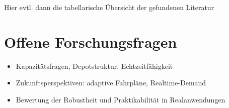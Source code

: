 Hier evtl. dann die tabellarische Übersicht der gefundenen Literatur
\section{Offene Forschungsfragen}
\begin{itemize}
    \item Kapazitätsfragen, Depotstruktur, Echtzeitfähigkeit
    \item Zukunftsperspektiven: adaptive Fahrpläne, Realtime-Demand
    \item Bewertung der Robustheit und Praktikabilität in Realanwendungen
\end{itemize}
